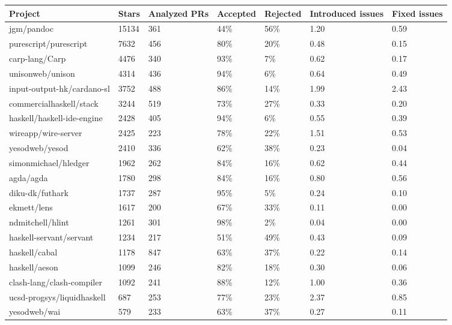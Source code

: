\begin{tabular}{|p{3.5cm}p{1.5cm}p{1.5cm}p{1.5cm}p{1.5cm}p{1.5cm}p{1cm}|}
  \hline
Project & Stars & Analyzed PRs & Accepted & Rejected & Introduced issues & Fixed issues \\ 
  \hline \hline
jgm/pandoc & 15134 & 361 & 44\% & 56\% & 1.20 & 0.59 \\ 
  purescript/purescript & 7632 & 456 & 80\% & 20\% & 0.48 & 0.15 \\ 
  carp-lang/Carp & 4476 & 340 & 93\% & 7\% & 0.62 & 0.17 \\ 
  unisonweb/unison & 4314 & 436 & 94\% & 6\% & 0.64 & 0.49 \\ 
  input-output-hk/cardano-sl & 3752 & 488 & 86\% & 14\% & 1.99 & 2.43 \\ 
  commercialhaskell/stack & 3244 & 519 & 73\% & 27\% & 0.33 & 0.20 \\ 
  haskell/haskell-ide-engine & 2428 & 405 & 94\% & 6\% & 0.55 & 0.39 \\ 
  wireapp/wire-server & 2425 & 223 & 78\% & 22\% & 1.51 & 0.53 \\ 
  yesodweb/yesod & 2410 & 336 & 62\% & 38\% & 0.23 & 0.04 \\ 
  simonmichael/hledger & 1962 & 262 & 84\% & 16\% & 0.62 & 0.44 \\ 
  agda/agda & 1780 & 298 & 84\% & 16\% & 0.80 & 0.56 \\ 
  diku-dk/futhark & 1737 & 287 & 95\% & 5\% & 0.24 & 0.10 \\ 
  ekmett/lens & 1617 & 200 & 67\% & 33\% & 0.11 & 0.00 \\ 
  ndmitchell/hlint & 1261 & 301 & 98\% & 2\% & 0.04 & 0.00 \\ 
  haskell-servant/servant & 1234 & 217 & 51\% & 49\% & 0.43 & 0.09 \\ 
  haskell/cabal & 1178 & 847 & 63\% & 37\% & 0.22 & 0.14 \\ 
  haskell/aeson & 1099 & 246 & 82\% & 18\% & 0.30 & 0.06 \\ 
  clash-lang/clash-compiler & 1092 & 241 & 88\% & 12\% & 1.00 & 0.36 \\ 
  ucsd-progsys/liquidhaskell & 687 & 253 & 77\% & 23\% & 2.37 & 0.85 \\ 
  yesodweb/wai & 579 & 233 & 63\% & 37\% & 0.27 & 0.11 \\ 
   \hline
\end{tabular}
